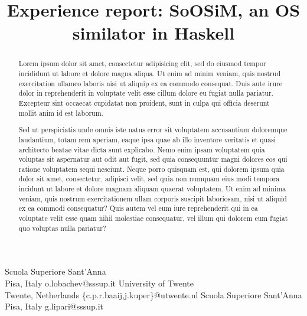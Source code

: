 \documentclass[preprint]{sigplanconf}
\newcommand{\soosim}{SoOSiM\xspace}
\begin{document}
\copyrightdata{[to be supplied]}

\preprintfooter{\today}   %

\title{Experience report: \soosim, an OS similator in Haskell}

           {Scuola Superiore Sant'Anna\\Pisa, Italy}
           {o.lobachev@sssup.it}
           {University of Twente\\Twente, Netherlands}
           {\{c.p.r.baaij,j.kuper\}@utwente.nl}
           {Scuola Superiore Sant'Anna\\Pisa, Italy}
           {g.lipari@sssup.it}


\maketitle

\begin{abstract}
  Lorem ipsum dolor sit amet, consectetur adipisicing elit, sed do
  eiusmod tempor incididunt ut labore et dolore magna aliqua. Ut enim
  ad minim veniam, quis nostrud exercitation ullamco laboris nisi ut
  aliquip ex ea commodo consequat. Duis aute irure dolor in
  reprehenderit in voluptate velit esse cillum dolore eu fugiat nulla
  pariatur. Excepteur sint occaecat cupidatat non proident, sunt in
  culpa qui officia deserunt mollit anim id est laborum.


  Sed ut perspiciatis unde omnis iste natus error sit voluptatem
  accusantium doloremque laudantium, totam rem aperiam, eaque ipsa
  quae ab illo inventore veritatis et quasi architecto beatae vitae
  dicta sunt explicabo. Nemo enim ipsam voluptatem quia voluptas sit
  aspernatur aut odit aut fugit, sed quia consequuntur magni dolores
  eos qui ratione voluptatem sequi nesciunt. Neque porro quisquam est,
  qui dolorem ipsum quia dolor sit amet, consectetur, adipisci velit,
  sed quia non numquam eius modi tempora incidunt ut labore et dolore
  magnam aliquam quaerat voluptatem. Ut enim ad minima veniam, quis
  nostrum exercitationem ullam corporis suscipit laboriosam, nisi ut
  aliquid ex ea commodi consequatur? Quis autem vel eum iure
  reprehenderit qui in ea voluptate velit esse quam nihil molestiae
  consequatur, vel illum qui dolorem eum fugiat quo voluptas nulla
  pariatur?
\end{abstract}
\end{document}
